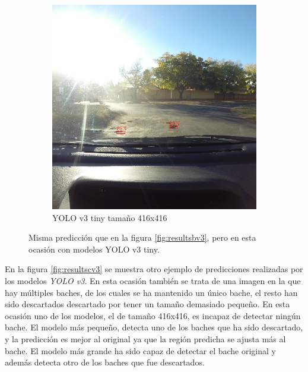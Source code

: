 \begin{figure}[H]
\begin{subfigure}[h]{0.45\linewidth}
		\includegraphics[width=\linewidth]{images/results_b_yolo_v3_tiny_416.jpg}
		\caption{YOLO v3 tiny tamaño 416x416}
	\end{subfigure}
	\caption{Misma predicción que en la figura \ref{fig:resultsbv3}, pero en esta ocasión con modelos YOLO v3 tiny.}
	\label{fig:resultsbv3tiny}
\end{figure}

En la figura \ref{fig:resultscv3} se muestra otro ejemplo de predicciones realizadas por los modelos \textit{YOLO v3}. En esta ocasión también se trata de una imagen en la que hay múltiples baches, de los cuales se ha mantenido un único bache, el resto han sido descartados descartado por tener un tamaño demasiado pequeño. En esta ocasión uno de los modelos, el de tamaño 416x416, es incapaz de detectar ningún bache. El modelo más pequeño, detecta uno de los baches que ha sido descartado, y la predicción es mejor al original ya que la región predicha se ajusta más al bache. El modelo más grande ha sido capaz de detectar el bache original y además detecta otro de los baches que fue descartados.

